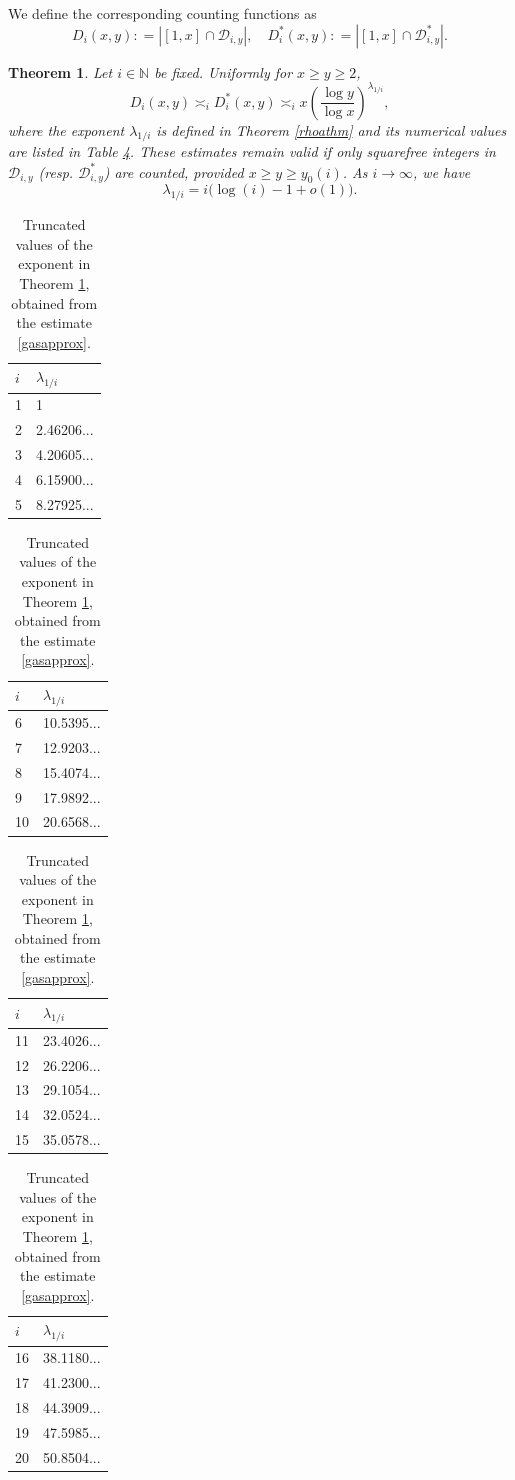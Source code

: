 \documentclass[11pt]{amsart}
\newtheorem{theorem}{Theorem}
\begin{document}
We define the corresponding counting functions as
$$ 
D_i(x,y): = | [1,x] \cap \mathcal{D}_{i,y} |, \quad D^*_i(x,y): = | [1,x] \cap \mathcal{D}^*_{i,y} |.
$$


\begin{theorem}\label{thmDkasymp}
Let $i \in \mathbb{N}$ be fixed. Uniformly for $x\ge y \ge 2$,
$$
 D_i(x,y) \asymp_i D_i^*(x,y)   \asymp_i x \left(\frac{\log y }{\log x}\right)^{\lambda_{1/i}},
$$
where the exponent $\lambda_{1/i}$ is defined in Theorem \ref{rhoathm} and its numerical values are listed in Table \ref{tablelambda}.
These estimates remain valid if only squarefree integers in $\mathcal{D}_{i,y}$ (resp. $\mathcal{D}^*_{i,y}$)  are counted, provided $x\ge y \ge y_0(i)$. 
As $i\to \infty$, we have 
$$\lambda_{1/i}= i \bigl(\log (i) -1 +o(1)\bigr).$$
\end{theorem}

\begin{table}[h]
  \begin{tabular}{ | l | l | }
   \hline
    $i$ & $\lambda_{1/i}$ \\ \hline
    1 & 1  \\ \hline
2 & 2.46206...  \\ \hline
3 & 4.20605... \\ \hline
4 & 6.15900... \\ \hline
5 & 8.27925...  \\ \hline
  \end{tabular}
\quad 
 \begin{tabular}{ | l | l | }
   \hline
    $i$ & $\lambda_{1/i}$ \\ \hline
6 & 10.5395... \\ \hline
7 & 12.9203... \\ \hline
8 & 15.4074...  \\ \hline
9 & 17.9892...   \\ \hline
10 & 20.6568...  \\ \hline
    \end{tabular}
\quad 
 \begin{tabular}{ | l | l | }
   \hline
    $i$ & $\lambda_{1/i}$ \\ \hline
11 & 23.4026... \\ \hline
12 & 26.2206... \\ \hline
13 & 29.1054...  \\ \hline
14 & 32.0524...   \\ \hline
15 & 35.0578...  \\ \hline
    \end{tabular}
\quad 
 \begin{tabular}{ | l | l | }
   \hline
    $i$ & $\lambda_{1/i}$ \\ \hline
16 & 38.1180... \\ \hline
17 & 41.2300... \\ \hline
18 & 44.3909...  \\ \hline
19 & 47.5985...   \\ \hline
20 & 50.8504...  \\ \hline
    \end{tabular}
  \caption{Truncated values of the exponent in Theorem \ref{thmDkasymp}, obtained from the estimate \eqref{gasapprox}.}
  \label{tablelambda}
  \end{table}
\end{document}
